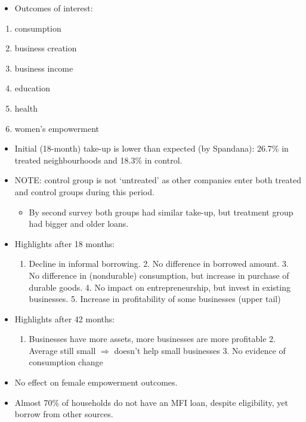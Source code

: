 \documentclass[
  letterpaper,
  DIV=11,
  numbers=noendperiod]{scrreprt}
\providecommand{\tightlist}{%
  \setlength{\itemsep}{0pt}\setlength{\parskip}{0pt}}\usepackage{longtable,booktabs,array}
\theoremstyle{definition}
\theoremstyle{remark}
\begin{document}
\begin{itemize}
\tightlist
\item
  Outcomes of interest:
\end{itemize}

\begin{enumerate}
\def\labelenumi{\arabic{enumi}.}
\tightlist
\item
  consumption
\item
  business creation
\item
  business income
\item
  education
\item
  health
\item
  women's empowerment
\end{enumerate}

\begin{itemize}
\item
  Initial (18-month) take-up is lower than expected (by Spandana):
  26.7\% in treated neighbourhoods and 18.3\% in control.
\item
  NOTE: control group is not `untreated' as other companies enter both
  treated and control groups during this period.

  \par

  \begin{itemize}
  \tightlist
  \item
    By second survey both groups had similar take-up, but treatment
    group had bigger and older loans.
  \end{itemize}
\item
  Highlights after 18 months:

  \par

  \begin{enumerate}
  \def\labelenumi{\arabic{enumi}.}
  \tightlist
  \item
    Decline in informal borrowing. 2. No difference in borrowed amount.
    3. No difference in (nondurable) consumption, but increase in
    purchase of durable goods. 4. No impact on entrepreneurship, but
    invest in existing businesses. 5. Increase in profitability of some
    businesses (upper tail)
  \end{enumerate}
\item
  Highlights after 42 months:

  \par

  \begin{enumerate}
  \def\labelenumi{\arabic{enumi}.}
  \tightlist
  \item
    Businesses have more assets, more businesses are more profitable 2.
    Average still small \(\Rightarrow\) doesn't help small businesses 3.
    No evidence of consumption change
  \end{enumerate}
\item
  No effect on female empowerment outcomes.
\item
  Almost 70\% of households do not have an MFI loan, despite
  eligibility, yet borrow from other sources.
\end{itemize}
\end{document}
